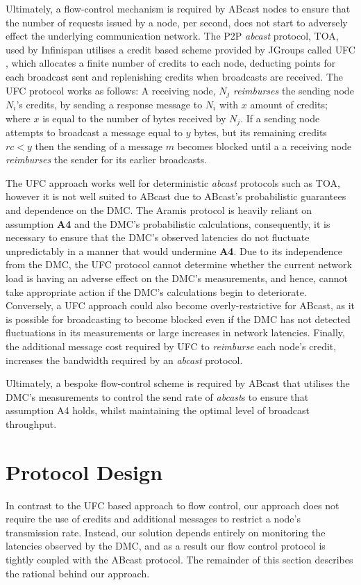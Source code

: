 Ultimately, a flow-control mechanism is required by \textsf{ABcast} nodes to ensure that the number of requests issued by a node, per second, does not start to adversely effect the underlying communication network.  The P2P \emph{abcast} protocol, TOA, used by Infinispan utilises a credit based scheme provided by JGroups called \textsf{UFC} \citep{JGroupsUFC}, which allocates a finite number of credits to each node, deducting points for each broadcast sent and replenishing credits when broadcasts are received.  The \textsf{UFC} protocol works as follows: A receiving node, $N_j$ \emph{reimburses} the sending node $N_i$'s credits, by sending a response message to $N_i$ with $x$ amount of credits; where $x$ is equal to the number of bytes received by $N_j$.  If a sending node  attempts to broadcast a message equal to $y$ bytes, but its remaining credits $rc < y$ then the sending of a message $m$ becomes blocked until a a receiving node \emph{reimburses} the sender for its earlier broadcasts.  

The \textsf{UFC} approach works well for deterministic \emph{abcast} protocols such as TOA, however it is not well suited to \textsf{ABcast} due to \textsf{ABcast}'s probabilistic guarantees and dependence on the DMC.  The \textsf{Aramis} protocol is heavily reliant on assumption \textbf{A4} and the DMC's probabilistic calculations, consequently, it is necessary to ensure that the DMC's observed latencies do not fluctuate unpredictably in a manner that would undermine \textbf{A4}.  Due to its independence from the DMC, the \textsf{UFC} protocol cannot determine whether the current network load is having an adverse effect on the DMC's measurements,  and hence, cannot take appropriate action if the DMC's calculations begin to deteriorate.  Conversely, a \textsf{UFC} approach could also become overly-restrictive for \textsf{ABcast}, as it is possible for broadcasting to become blocked even if the DMC has not detected fluctuations in its measurements or large increases in network latencies.  Finally, the additional message cost required by \textsf{UFC} to \emph{reimburse} each node's credit, increases the bandwidth required by an \emph{abcast} protocol.  

Ultimately, a bespoke flow-control scheme is required by \textsf{ABcast} that utilises the DMC's measurements to control the send rate of \emph{abcast}s to ensure that assumption A4 holds, whilst maintaining the optimal level of broadcast throughput.  

\section{Protocol Design}
    In contrast to the \textsf{UFC} based approach to flow control, our approach does not require the use of credits and additional messages to restrict a node's transmission rate.  Instead, our solution depends entirely on monitoring the latencies observed by the DMC, and as a result our flow control protocol is tightly coupled with the \textsf{ABcast} protocol.  The remainder of this section describes the rational behind our approach.  
    
